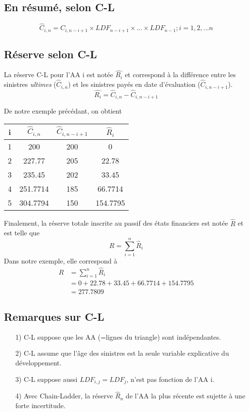 \documentclass[11pt,french]{report}
\begin{document}
\subsection*{En résumé, selon C-L}
\begin{equation}
\label{eq:CL}
\widehat{C}_{i,n} = C_{i,n-i+1} \times LDF_{n-i+1} \times ... \times LDF_{n-1}; i =1,2,...n
\end{equation}

\subsection*{Réserve selon C-L}
La réserve C-L pour l'AA i est notée $\widehat{R_i}$ et correspond à la différence entre les sinistres \textit{ultimes} ($\widehat{C}_{i,n}$) et les sinistres payés en date d'évaluation ($\widehat{C}_{i,n-i+1}$).
\begin{equation}
\widehat{R_i} = \widehat{C}_{i,n} - \widehat{C}_{i,n-i+1}
\end{equation}

De notre exemple précédant, on obtient 

\begin{center}
\begin{tabular}{|c|c|c|c|}
  \hline
   i & $ \widehat{C}_{i,n} $ & $\widehat{C}_{i,n-i+1}$ & $\widehat{R}_i$  \\
  \hline
  1 & 200 & 200 & 0 \\
  2 & 227.77 & 205 & 22.78 \\
  3 & 235.45 & 202 & 33.45 \\
  4 & 251.7714 & 185 & 66.7714 \\
  5 & 304.7794 & 150 & 154.7795 \\
  \hline
\end{tabular}
\end{center}
Finalement, la réserve totale inscrite au passif des états financiers est notée $\widehat{R}$ et est telle que
$$ R = \sum_{i=1}^{n} \widehat{R}_i $$
Dans notre exemple, elle correspond à
\begin{align*}
R &= \sum_{i=1}^{n} \widehat{R}_i \\
&= 0 + 22.78 +33.45 + 66.7714 + 154.7795 \\
&=277.7809
\end{align*}

\subsection*{Remarques sur C-L}
\begin{itemize}
\item[1)] C-L suppose que les AA (=lignes du triangle) sont indépendantes.
\item[2)] C-L assume que l'âge des sinistres est la seule variable explicative du développement.
\item[3)] C-L suppose aussi $LDF_{i,j} = LDF_j$, n'est pas fonction de l'AA i.
\item[4)] Avec Chain-Ladder, la réserve $\widehat{R}_n$ de l'AA la plus récente est sujette à une forte incertitude.
\end{itemize}
\end{document}
